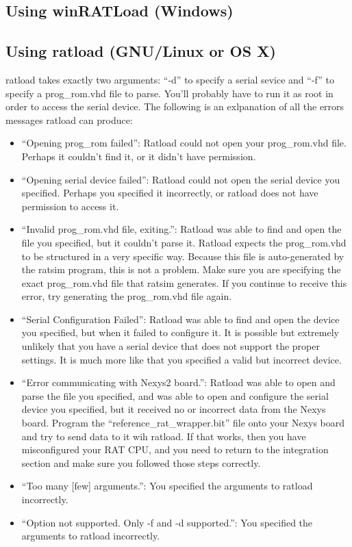 \documentclass[notitlepage]{article}
\begin{document}
\subsection{Using winRATLoad (Windows)}

\subsection{Using ratload (GNU/Linux or OS X)}
ratload takes exactly two arguments: ``-d'' to specify a serial sevice and ``-f'' to specify a prog\_rom.vhd file to parse. You'll probably have to run it as root in order to access the serial device. The following is an exlpanation of all the errors messages ratload can produce:
\begin{itemize}
\item ``Opening prog\_rom failed'': Ratload could not open your prog\_rom.vhd file. Perhaps it couldn't find it, or it didn't have permission.
\item ``Opening serial device failed'': Ratload could not open the serial device you specified. Perhaps you specified it incorrectly, or ratload does not have permission to access it.
\item ``Invalid prog\_rom.vhd file, exiting.'': Ratload was able to find and open the file you specified, but it couldn't parse it. Ratload expects the prog\_rom.vhd to be structured in a very specific way. Because this file is auto-generated by the ratsim program, this is not a problem. Make sure you are specifying the exact prog\_rom.vhd file that ratsim generates. If you continue to receive this error, try generating the prog\_rom.vhd file again.
\item ``Serial Configuration Failed'': Ratload was able to find and open the device you specified, but when it failed to configure it. It is possible but extremely unlikely that you have a serial device that does not support the proper settings. It is much more like that you specified a valid but incorrect device.
\item ``Error communicating with Nexys2 board.'': Ratload was able to open and parse the file you specified, and was able to open and configure the serial device you specified, but it received no or incorrect data from the Nexys board. Program the ``reference\_rat\_wrapper.bit'' file onto your Nexys board and try to send data to it wih ratload. If that works, then you have misconfigured your RAT CPU, and you need to return to the integration section and make sure you followed those steps correctly. 
\item ``Too many [few] arguments.'': You specified the arguments to ratload incorrectly.
\item ``Option not supported. Only -f and -d supported.'': You specified the arguments to ratload incorrectly.
\end{itemize}
\end{document}
